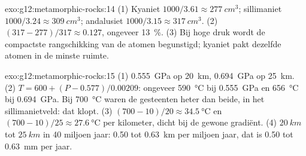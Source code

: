 \begin{solution}{exo:g12:metamorphic-rocks:14}
(1) Kyaniet $1000/3.61 \approx \qty{277}{cm^3}$; sillimaniet $1000/3.24
\approx \qty{309}{cm^3}$; andalusiet $1000/3.15 \approx \qty{317}{cm^3}$.
(2) $(317 - 277)/317 \approx 0.127$, ongeveer \qty{13}{\percent}. (3) Bij hoge
druk wordt de compactste rangschikking van de atomen begunstigd; kyaniet
pakt dezelfde atomen in de minste ruimte.
\end{solution}

\begin{solution}{exo:g12:metamorphic-rocks:15}
(1) \qty{0.555}{GPa} op \qty{20}{km}, \qty{0.694}{GPa} op \qty{25}{km}.
(2) $T = 600 + (P - 0.577)/0.00209$: ongeveer \qty{590}{\celsius} bij
\qty{0.555}{GPa} en \qty{656}{\celsius} bij \qty{0.694}{GPa}. Bij
\qty{700}{\celsius} waren de gesteenten heter dan beide, in het
sillimanietveld: dat klopt. (3) $(700 - 10)/20 \approx \qty{34.5}{\celsius}$ en
$(700 - 10)/25 \approx \qty{27.6}{\celsius}$ per kilometer, dicht bij de
gewone gradiënt. (4) $\qty{20}{km}$ tot $\qty{25}{km}$ in 40 miljoen jaar:
0.50 tot \qty{0.63}{km} per miljoen jaar, dat is 0.50 tot \qty{0.63}{mm} per
jaar.
\end{solution}

